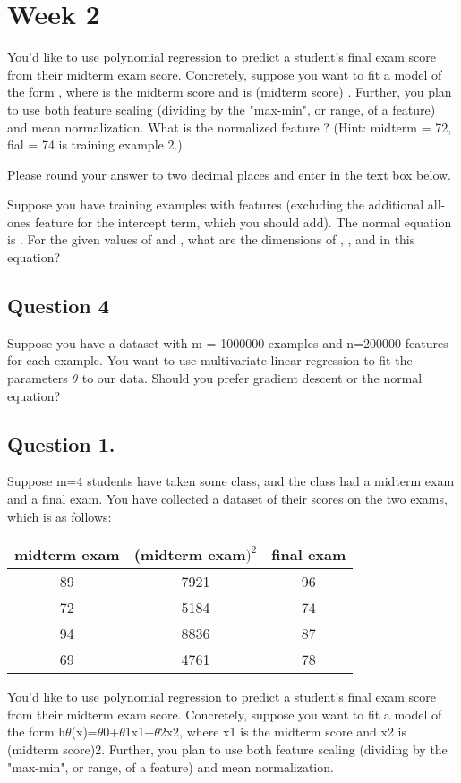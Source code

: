 \documentclass[11pt]{article} %
\begin{document}
	\section{Week 2}
	You'd like to use polynomial regression to predict a student's final exam score
	from their midterm exam score. Concretely, suppose you want to fit a model
	of the form , where is the midterm score and
	is (midterm score) . Further, you plan to use both feature scaling (dividing
	by the "max-min", or range, of a feature) and mean normalization.
	What is the normalized feature ? (Hint: midterm = 72, fial = 74 is training
	example 2.) 
	
	
	Please round your answer to two decimal places and enter in
	the text box below.
	
	
	Suppose you have training examples with features (excluding
	the additional all-ones feature for the intercept term, which you should add).
	The normal equation is . For the given values of and
	, what are the dimensions of , , and in this equation?
	
	\subsection{Question 4}
	Suppose you have a dataset with m = 1000000 examples and n=200000
	features for each example. You want to use multivariate linear regression to
	fit the parameters $\theta$ to our data. Should you prefer gradient descent or the
	normal equation?
	
	
	
	\subsection{Question 1.} 
	Suppose m=4 students have taken some class, and the class had a midterm exam and a final exam. You have collected a dataset of their scores on the two exams, which is as follows:
	\begin{tabular}{|c|c|c|}
		midterm exam &	(midterm exam$)^2$ &	final exam \\ \hline
		89 &	7921 &	96 \\
		72 &	5184 &	74 \\
		94 &	8836 &	87 \\
		69 &	4761 &	78 \\
	\end{tabular} 
	
	You'd like to use polynomial regression to predict a student's final exam score from their midterm exam score. Concretely, suppose you want to fit a model of the form h$\theta$(x)=$\theta$0+$\theta$1x1+$\theta$2x2, where x1 is the midterm score and x2 is (midterm score)2. Further, you plan to use both feature scaling (dividing by the "max-min", or range, of a feature) and mean normalization.
	
\end{document}
